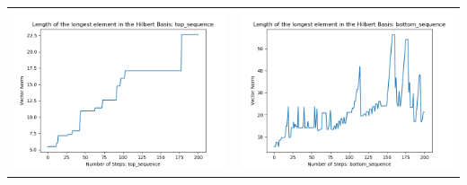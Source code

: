 \documentclass[10pt]{article}
\begin{document}
\begin{tabular}{c|c}
\begin{minipage}{.45\textwidth}
\includegraphics[width=\textwidth]{"DATA/5d/6 generators 2 bound F/top_sequence LENGTH"}
\end{minipage} &
\begin{minipage}{.45\textwidth}
\includegraphics[width=\textwidth]{"DATA/5d/6 generators 2 bound F bottomup/bottom_sequence LENGTH"}
\end{minipage}
\end{tabular}
\end{document}
